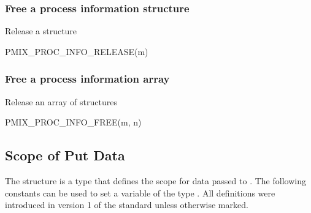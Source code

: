 \begin{arglist}
\end{arglist}

\subsubsection{Free a process information structure}

Release a  structure

\cspecificstart
\begin{codepar}
PMIX_PROC_INFO_RELEASE(m)
\end{codepar}
\cspecificend

\begin{arglist}
\end{arglist}

\subsubsection{Free a process information array}

Release an array of  structures

\cspecificstart
\begin{codepar}
PMIX_PROC_INFO_FREE(m, n)
\end{codepar}
\cspecificend

\begin{arglist}
\end{arglist}


\subsection{Scope of Put Data}

The  structure is a  type that defines the scope for data passed to .
The following constants can be used to set a variable of the type . All definitions were introduced in version 1 of the standard unless otherwise marked.


